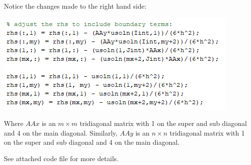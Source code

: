 \documentclass{article}
\begin{document}
Notice the changes made to the right hand side:
\begin{center}
    \includegraphics[scale = 0.9]{change.PNG}
\end{center}
Where $AAx$ is an $m\times m$ tridiagonal matrix with 1 on the super and sub diagonal and 4 on the main diagonal. Similarly, $AAy$ is an $n \times n$ tridiagonal matrix with 1 on the super and sub diagonal and 4 on the main diagonal.


See attached code file for more details.



\newpage
\end{document}
